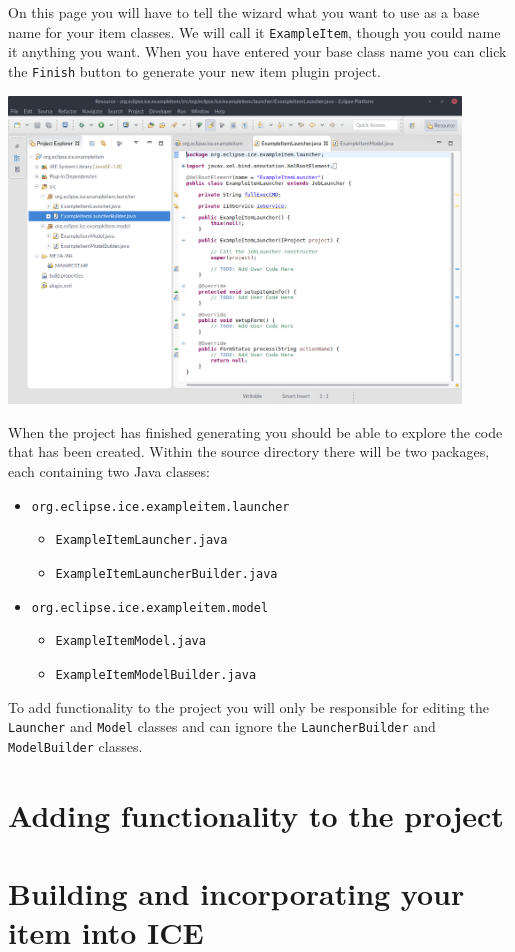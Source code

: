 \documentclass{article}
\begin{document}
On this page you will have to tell the wizard what you want to use as a base
name for your item classes.  We will call it \texttt{ExampleItem}, though you
could name it anything you want.  When you have entered your base class name
you can click the \texttt{Finish} button to generate your new item plugin
project.

\begin{center}
\includegraphics[width=12cm]{images/6}
\end{center}

When the project has finished generating you should be able to explore the code
that has been created.  Within the source directory there will be two packages,
each containing two Java classes:

\begin{itemize}
    \item \texttt{org.eclipse.ice.exampleitem.launcher}
    \begin{itemize}
        \item \texttt{ExampleItemLauncher.java}
        \item \texttt{ExampleItemLauncherBuilder.java}
    \end{itemize}
    \item \texttt{org.eclipse.ice.exampleitem.model}
    \begin{itemize}
        \item \texttt{ExampleItemModel.java}
        \item \texttt{ExampleItemModelBuilder.java}
    \end{itemize}
\end{itemize}

To add functionality to the project you will only be responsible for editing
the \texttt{Launcher} and \texttt{Model} classes and can ignore the
\texttt{LauncherBuilder} and \texttt{ModelBuilder} classes.

\section{Adding functionality to the project}


\section{Building and incorporating your item into ICE}
\end{document}
